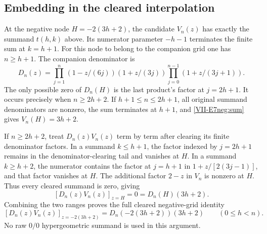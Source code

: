 \documentclass[11pt,letterpaper]{article}
\numberwithin{equation}{section}
\begin{document}
\subsection{Embedding in the cleared interpolation}
At the negative node $H=-2(3h+2)$, the candidate $V_n(z)$ has
exactly the summand $t(h,k)$ above. Its numerator parameter
$-h-1$ terminates the finite sum at $k=h+1$.
For this node to belong to the companion grid one has $n\ge h+1$.
The companion denominator is
\[
 D_n(z)=\prod_{j=1}^n(1-z/(6j))(1+z/(3j))
         \prod_{j=0}^{n-1}(1+z/(3j+1)).
\]
The only possible zero of $D_n(H)$ is the last product's factor
at $j=2h+1$. It occurs precisely when $n\ge2h+2$.
If $h+1\le n\le2h+1$, all original summand denominators are nonzero,
the sum terminates at $h+1$, and \eqref{VII-E7neg:sum} gives
$V_n(H)=3h+2$.

If $n\ge2h+2$, treat $D_n(z)V_n(z)$ term by term after clearing
its finite denominator factors. In a summand $k\le h+1$, the
factor indexed by $j=2h+1$ remains in the denominator-clearing
tail and vanishes at $H$. In a summand $k\ge h+2$, the numerator
contains the factor at $j=h+1$ in
$1+z/[2(3j-1)]$, and that factor vanishes at $H$.
The additional factor $2-z$ in $V_n$ is nonzero at $H$.
Thus every cleared summand is zero, giving
\[
 [D_n(z)V_n(z)]_{z=H}=0=D_n(H)(3h+2).
\]
Combining the two ranges proves the full cleared negative-grid identity
\begin{equation}\label{VII-E7neg:cleared}
 \boxed{[D_n(z)V_n(z)]_{z=-2(3h+2)}
 =D_n(-2(3h+2))(3h+2)\qquad(0\le h<n).}
\end{equation}
No raw $0/0$ hypergeometric summand is used in this argument.
\end{document}
